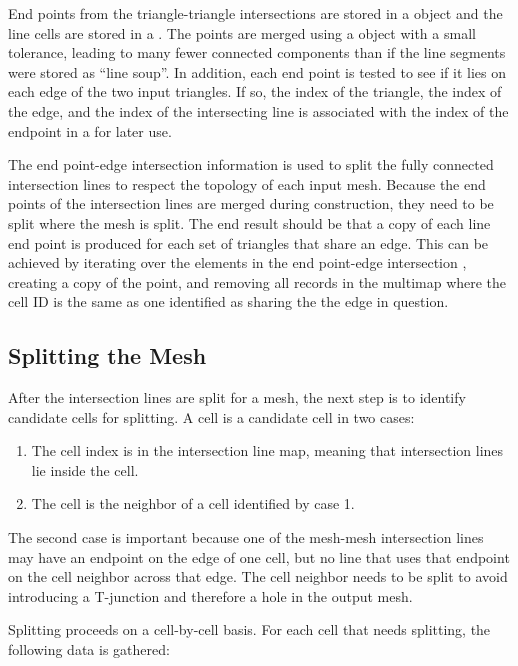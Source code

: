 \documentclass{InsightArticle}
\begin{document}
End points from the triangle-triangle intersections are stored in a  object and the line cells are stored in a . The points  are merged using a  object with a small tolerance, leading to many fewer connected components than if the line segments were stored as ``line soup''. In addition, each end point is tested to see if it lies on each edge of the two input triangles. If so, the index of the triangle, the index of the edge, and the index of the intersecting line is associated with the index of the endpoint in a  for later use.

The end point-edge intersection information is used to split the fully connected intersection lines to respect the topology of each input mesh. Because the end points of the intersection lines are merged during construction, they need to be split where the mesh is split. The end result should be that a copy of each line end point is produced for each set of triangles that share an edge. This can be achieved by iterating over the elements in the end point-edge intersection , creating a copy of the point, and removing all records in the multimap where the cell ID is the same as one identified as sharing the the edge in question.

\subsection{Splitting the Mesh}

After the intersection lines are split for a mesh, the next step is to identify candidate cells for splitting. A cell is a candidate cell in two cases:

\begin{enumerate}
\item The cell index is in the intersection line map, meaning that intersection lines lie inside the cell.
\item The cell is the neighbor of a cell identified by case 1.
\end{enumerate}

The second case is important because one of the mesh-mesh intersection lines may have an endpoint on the edge of one cell, but no line that uses that endpoint on the cell neighbor across that edge. The cell neighbor needs to be split to avoid introducing a T-junction and therefore a hole in the output mesh.

Splitting proceeds on a cell-by-cell basis. For each cell that needs splitting, the following data is gathered:
\end{document}
